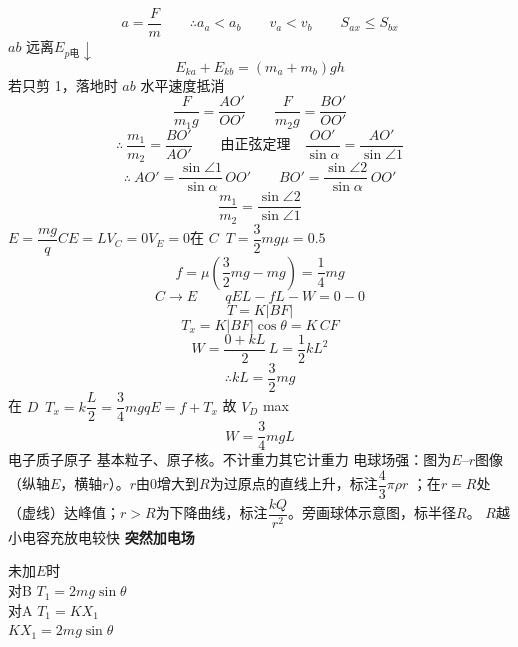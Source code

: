 \[
a=\frac{F}{m}\qquad \therefore a_a<a_b\qquad v_a<v_b\qquad S_{ax}\le S_{bx}
\]
$ab$ 远离\quad $E_{p\text{电}}\downarrow$
\[
E_{ka}+E_{kb}=(m_a+m_b)gh
\]
若只剪 1，落地时 $ab$ 水平速度抵消
\[
\frac{F}{m_1g}=\frac{AO'}{OO'}\qquad \frac{F}{m_2g}=\frac{BO'}{OO'}
\]
\[
\therefore\ \frac{m_1}{m_2}=\frac{BO'}{AO'}\qquad \text{由正弦定理}\quad \frac{OO'}{\sin\alpha}=\frac{AO'}{\sin\angle1}
\]
\[
\therefore\ AO'=\frac{\sin\angle1}{\sin\alpha}\,OO'\qquad BO'=\frac{\sin\angle2}{\sin\alpha}\,OO'
\]
\[
\frac{m_1}{m_2}=\frac{\sin\angle2}{\sin\angle1}
\]
$E=\dfrac{mg}{q}$\qquad $CE=L$\qquad $V_C=0$\quad $V_E=0$\qquad 在 $C$\ $T=\dfrac32mg$\quad $\mu=0.5$
\[
f=\mu\left(\frac32mg-mg\right)=\frac14mg
\]
\[
C\to E\qquad qEL-fL-W=0-0
\]
\[
T=K|BF| %
\]
\[
T_x=K|BF|\cos\theta=K\,CF
\]
\[
W=\frac{0+kL}{2}\,L=\frac12kL^2
\]
\[
\therefore kL=\frac32mg
\]
在 $D$\ $T_x=k\dfrac{L}{2}=\dfrac34mg$\qquad $qE=f+T_x$ 故 $V_D$ max
\[
W=\frac34mgL
\]
电子质子原子 %
基本粒子、原子核。不计重力\quad 其它计重力
电球场强：图为$E$--$r$图像（纵轴$E$，横轴$r$）。$r$由0增大到$R$为过原点的直线上升，标注$\dfrac{4}{3}\pi\rho r$ %
；在$r=R$处（虚线）达峰值；$r>R$为下降曲线，标注$\dfrac{kQ}{r^2}$。旁画球体示意图，标半径$R$。
$R$越小\quad 电容充放电较快
\textbf{突然加电场}


未加$E$时\\
\hspace*{1em}对B $T_1=2mg\sin\theta$\\
\hspace*{1em}对A $T_1=KX_1$\\
\hspace*{2em}$KX_1=2mg\sin\theta$

